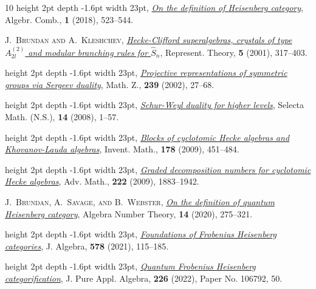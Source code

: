 \documentclass[a4paper,11pt]{amsart}
\numberwithin{equation}{subsection}
\theoremstyle{definition}
\theoremstyle{theorem}
\theoremstyle{remark}
\begin{document}
\begin{thebibliography}{10}
\leavevmode\vrule height 2pt depth -1.6pt width 23pt,
  \href{http://dx.doi.org/10.5802/alco.26}{\textit{On the definition of
  {H}eisenberg category}}, Algebr. Comb., \textbf{1} (2018), 523--544.

\textsc{J.~Brundan and A.~Kleshchev},
  \href{http://dx.doi.org/10.1090/S1088-4165-01-00123-6}{\textit{Hecke-{C}lifford
  superalgebras, crystals of type {$A_{2l}^{(2)}$} and modular branching rules
  for {$\hat S_n$}}}, Represent. Theory, \textbf{5} (2001), 317--403.

\leavevmode\vrule height 2pt depth -1.6pt width 23pt,
  \href{http://dx.doi.org/10.1007/s002090100282}{\textit{Projective
  representations of symmetric groups via {S}ergeev duality}}, Math. Z.,
  \textbf{239} (2002), 27--68.

\leavevmode\vrule height 2pt depth -1.6pt width 23pt,
  \href{http://dx.doi.org/10.1007/s00029-008-0059-7}{\textit{Schur-{W}eyl
  duality for higher levels}}, Selecta Math. (N.S.), \textbf{14} (2008), 1--57.

\leavevmode\vrule height 2pt depth -1.6pt width 23pt,
  \href{http://dx.doi.org/10.1007/s00222-009-0204-8}{\textit{Blocks of
  cyclotomic {H}ecke algebras and {K}hovanov-{L}auda algebras}}, Invent. Math.,
  \textbf{178} (2009), 451--484.

\leavevmode\vrule height 2pt depth -1.6pt width 23pt,
  \href{http://dx.doi.org/10.1016/j.aim.2009.06.018}{\textit{Graded
  decomposition numbers for cyclotomic {H}ecke algebras}}, Adv. Math.,
  \textbf{222} (2009), 1883--1942.

\textsc{J.~Brundan, A.~Savage, and B.~Webster},
  \href{http://dx.doi.org/10.2140/ant.2020.14.275}{\textit{On the definition of
  quantum {H}eisenberg category}}, Algebra Number Theory, \textbf{14} (2020),
  275--321.

\leavevmode\vrule height 2pt depth -1.6pt width 23pt,
  \href{http://dx.doi.org/10.1016/j.jalgebra.2021.02.025}{\textit{Foundations
  of {F}robenius {H}eisenberg categories}}, J. Algebra, \textbf{578} (2021),
  115--185.

\leavevmode\vrule height 2pt depth -1.6pt width 23pt,
  \href{http://dx.doi.org/10.1016/j.jpaa.2021.106792}{\textit{Quantum
  {F}robenius {H}eisenberg categorification}}, J. Pure Appl. Algebra,
  \textbf{226} (2022), Paper No. 106792, 50.


\end{thebibliography}
\end{document}

